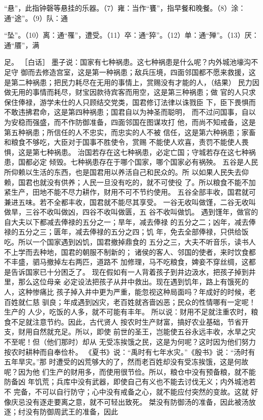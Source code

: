 \documentclass[12pt,UTF8]{ctexbook}
\begin{document}
“悬”，此指钟磬等悬挂的乐器。（7）雍：当作“饔”，指早餐和晚餐。（8）涂：通“途”。（9）队：通 

“坠”。（10）离：通“罹”，遭受。（11）卒：通“猝”。（12）单：通“殚”。（13）厌：通“餍”，满 

足。 
［白话］ 
墨子说：国家有七种祸患。这七种祸患是什么呢？内外城池壕沟不足守 
御而去修造宫室，这是第一种祸患；敌兵压境，四面邻国都不愿来救援，这 
是第二种祸患；把民力耗尽在无用的事情上，赏赐没有才能的人，（结果） 
民力因做无用的事情而耗尽，财宝因款待宾客而用空，这是第三种祸患；做 
官的人只求保住俸禄，游学未仕的人只顾结交党类，国君修订法律以诛戮臣 
下，臣下畏惧而不敢违拂君命，这是第四种祸患；国君自以为神圣而聪明， 
而不过问国事，自以为安稳而强盛，而不作防御准备，四面邻国在图谋攻打 
他，而尚不知戒备，这是第五种祸患；所信任的人不忠实，而忠实的人不被 
信任，这是第六种祸患；家畜和粮食不够吃，大臣对于国事不胜使令，赏赐 
不能使人欢喜，责罚不能使人畏惧，这是第七种祸患。 
治国若存在这七种祸患，必定亡国；守城若存在这七种祸患，国都必定 
倾毁。七种祸患存在于哪个国家，哪个国家必有祸殃。 
五谷是人民所仰赖以生活的东西，也是国君用以养活自己和民众的。所 
以如果人民失去仰赖，国君也就没有供养；人民一旦没有吃的，就不可使役 
了。所以粮食不能不加紧生产，田地不能不尽力耕作，财用不可不节约使用。 
五谷全部丰收，国君就可兼进五味。若不全都丰收，国君就不能尽其享受。 
一谷无收叫做馑，二谷无收叫做旱，三谷不收叫做凶，四谷不收叫做匮，五 
谷不收叫做饥。 
遇到馑年，做官的自大夫以下都减去俸禄的五分之一；旱年，减去俸禄 
的五分之二；凶年，减去俸禄的五分之三；匮年，减去俸禄的五分之四；饥 
年，免去全部俸禄，只供给饭吃。所以一个国家遇到凶饥，国君撤掉鼎食的 
五分之三，大夫不听音乐，读书人不上学而去种地，国君的朝服不制新的； 
诸侯的客人、邻国的使者，来时饮食都不丰盛，驷马撤掉左右两匹，道路不 
加修理，马不吃粮食，婢妾不穿丝绸，这都是告诉国家已十分困乏了。 
现在假如有一人背着孩子到井边汲水，把孩子掉到井里，那么这位母亲 
必定设法把孩子从井中救出。现在遇到饥年，路上有饿死的人，这种惨痛比 
孩子掉入井中更为严重，能忽视这种局面吗？年成好的时候，老百姓就仁慈 
驯良；年成遇到凶灾，老百姓就吝啬凶恶；民众的性情哪有一定呢！生产的 
人少，吃饭的人多，就不可能有丰年。 
所以说：财用不足就注重农时，粮食不足就注意节约。因此，古代贤人 
按农时生产财富，搞好农业基础，节省开支，财用自然就充足。所以，即使 
前世的圣王，岂能使五谷永远丰收，水旱之灾不至呢！但（他们那时）却从 
无受冻挨饿之民，这是为何呢？这时因为他们努力按农时耕种而自奉俭朴。 
《夏书》说：“禹时有七年水灾。”《殷书》说：“汤时有五年旱灾。”那 
时遭受的凶荒够大的了，然而老百姓却没有受冻挨饿，这是何故呢？因为他 
们生产的财用多，而使用很节俭。所以，粮仓中没有预备粮，就不能防备凶 
年饥荒；兵库中没有武器，即使自己有义也不能去讨伐无义；内外城池若不 
完备，不可以自行防守；心中没有戒备之心，就不能应付突然的变故。这就 
好像庆忌没有逐走要离之意，就不可轻出致死。 
桀没有防御汤的准备，因此被汤放逐；纣没有防御周武王的准备，因此 
\end{document}
